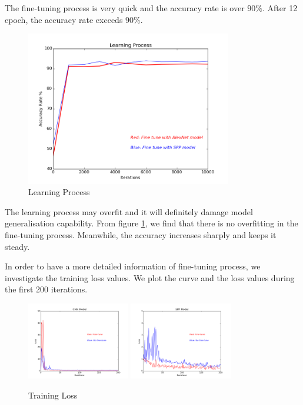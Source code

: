The fine-tuning process is very quick and the accuracy rate is over $90\%$. After 12 epoch, the accuracy rate exceeds $90\%$. 
\graphicspath{ {./Figures/} }
\begin{figure}[!htb]
    \centering
	\includegraphics[width=0.8\textwidth]{FinetuneAccuracy.png}
    \caption{Learning Process}%
    \label{fig:finetuneprocess}%
\end{figure}

The learning process may overfit and it will definitely damage model generalisation capability. From figure \ref{fig:finetuneprocess}, we find that there is no overfitting in the fine-tuning process. Meanwhile, the accuracy increases sharply and keeps it steady.

In order to have a more detailed information of fine-tuning process, we investigate the training loss values. We plot the curve and the loss values during the first 200 iterations.

\begin{figure}[!htb]
    \centering
	\includegraphics[width=0.4\textwidth]{finetuneCNNProcess.png}
	\includegraphics[width=0.4\textwidth]{finetuneSPPProcess.png}
    \caption{Training Loss}%
    \label{fig:FTvsSC}%
\end{figure}

